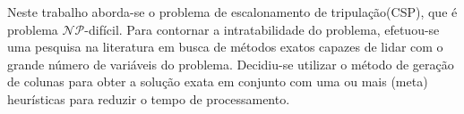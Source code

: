 Neste trabalho aborda-se o problema de escalonamento de tripula\c{c}\~ao(CSP),
que \'e problema $\mathcal{NP}$-dif\'icil. Para contornar a intratabilidade do
problema, efetuou-se uma pesquisa na literatura em busca de m\'etodos exatos
capazes de lidar com o grande n\'umero de vari\'aveis do problema.
Decidiu-se utilizar o m\'etodo de gera\c{c}\~ao de colunas para obter a solu\c{c}\~ao
exata em conjunto com uma ou mais (meta) heur\'isticas para reduzir o tempo de processamento.
